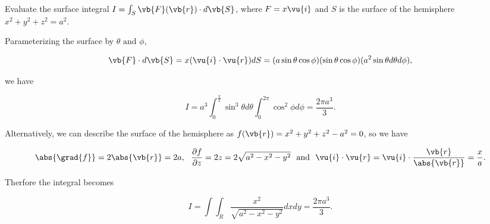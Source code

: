 \documentclass[english,a4paper,12pt]{report}
\begin{document}
{Evaluate the surface integral \( I = \int_{S}^{} \vb{F}(\vb{r} ) \cdot d\vb{S} \), where \(F = x \vu{i}  \) and \(S\) is the surface of the hemisphere \(x^2 + y^2 + z^2 = a^2\).}
{Parameterizing the surface by \(\theta \text { and } \phi \), 

\begin{equation}
	\vb{F} \cdot d\vb{S}  = x(\vu{i} \cdot \vu{r} )dS = (a \sin \theta \cos \phi )(\sin \theta \cos \phi )(a^2\sin \theta d \theta d\phi ),
\end{equation}

we have 

\begin{equation}
	I = a^3 \int_{0}^{\frac{\pi }{2} } \sin ^3 \theta d \theta \int_{0}^{2\pi } \cos ^2\phi d\phi = \frac{2\pi a^3 }{3}.    
\end{equation}

Alternatively, we can describe the surface of the hemisphere as \(f(\vb{r}) = x^2 + y^2 + z^2 - a^2 = 0\), so we have 

\begin{equation}
	\abs{\grad{f} } = 2\abs{\vb{r} } = 2a, ~~ 	\frac{\partial f}{\partial z} = 2z = 2\sqrt{a^2-x^2-y^2} ~\text { and }~ \vu{i} \cdot \vu{r} = \vu{i} \cdot \frac{\vb{r} }{\abs{\vb{r} } } = \frac{x}{a}. 
\end{equation}

Therfore the integral becomes

\begin{equation}
	I = \int \int_{R}^{} \frac{x^2}{\sqrt{a^2-x^2-y^2} }dxdy = \frac{2\pi a^3 }{3}.    
\end{equation}
 } 
 
\end{document}
